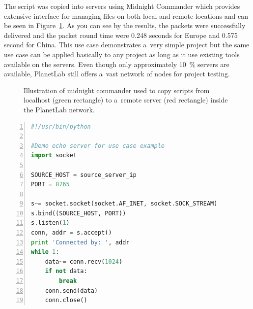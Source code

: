 {{{{{{{The script was copied into servers using Midnight Commander which provides extensive interface for managing files on both local and remote locations and can be seen in Figure~\ref{fig:midnightcommander}. As you can see by the results, the packets were successfully delivered and the packet round time were 0.248 seconds for Europe and 0.575 second for China. This use case demonstrates a~very simple project but the same use case can be applied basically to any project as long as it use existing tools available on the servers. Even though only approximately \SI{10}{\percent} servers are available, PlanetLab still offers a~vast network of nodes for project testing.

\begin{figure}[H]
	\centering
	\caption{Illustration of midnight commander used to copy scripts from localhost (green rectangle) to a~remote server (red rectangle) inside the PlanetLab network.}
	\label{fig:midnightcommander}
\end{figure}

{\noindent\begin{minipage}{\linewidth}
		\begin{lstlisting}[language=Python, numbers=left, label={lst:echoserver}, caption=Code of echo server., frame=single, showstringspaces=false, keywordstyle=\color{blue},captionpos=b]
#!/usr/bin/python

#Demo echo server for use case example
import socket

SOURCE_HOST = source_server_ip
PORT = 8765

s~= socket.socket(socket.AF_INET, socket.SOCK_STREAM)
s.bind((SOURCE_HOST, PORT))
s.listen(1)
conn, addr = s.accept()
print 'Connected by: ', addr
while 1:
	data~= conn.recv(1024)
	if not data:
		break
	conn.send(data)
	conn.close()
		\end{lstlisting}
	\end{minipage}

}}}}}}}}
